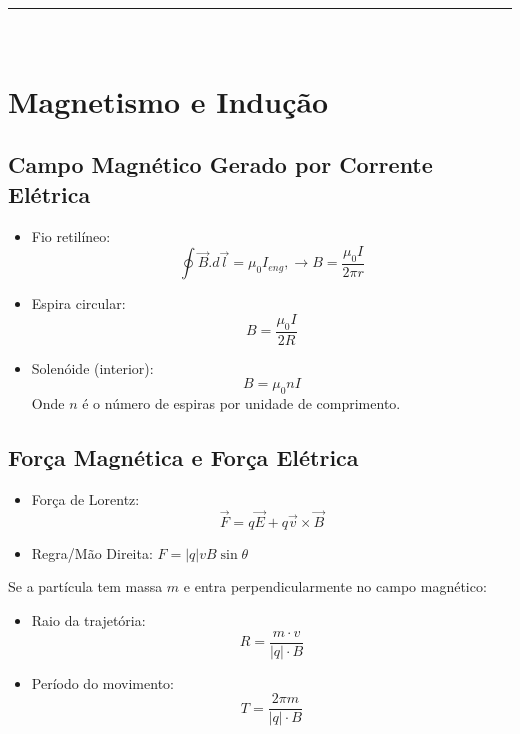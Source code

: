 \documentclass[a4paper,12pt]{article}
\begin{document}
\begin{multicols}{2}
\noindent\rule{\linewidth}{1pt}\\

\section{Magnetismo e Indução}

\subsection{Campo Magnético Gerado por Corrente Elétrica}
\begin{itemize}
    \item Fio retilíneo:
    \[
        \oint \vec{B}.d\vec{l} = \mu_{0}I_{eng}, \rightarrow B = \frac{\mu_0 I}{2\pi r}
    \]
    \item Espira circular:
    \[
        B = \frac{\mu_0 I}{2R}
    \]
    \item Solenóide (interior):
    \[
        B = \mu_0 n I
    \]
    Onde $n$ é o número de espiras por unidade de comprimento.
\end{itemize}

\subsection{Força Magn\'etica e Força El\'etrica}

\begin{itemize}
    \item For\c{c}a de Lorentz:
    \[
        \vec{F} = q\vec{E} + q \vec{v} \times \vec{B}
    \]

    \item Regra/M\~ao Direita: $ F = |q| v B \sin\theta$
\end{itemize}

Se a partícula tem massa $m$ e entra perpendicularmente no campo magnético:

\begin{itemize}
    \item Raio da trajetória:
    \begin{equation}
        R = \frac{m \cdot v}{|q| \cdot B}
    \end{equation}

    \item Período do movimento:
    \begin{equation}
        T = \frac{2\pi m}{|q| \cdot B}
    \end{equation}
\end{itemize}


\end{multicols}
\end{document}
